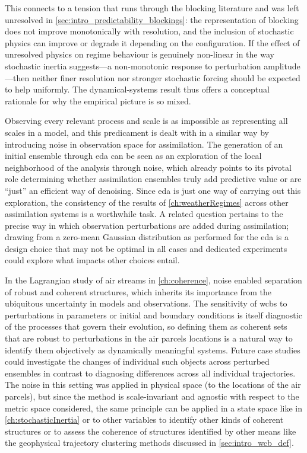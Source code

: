 This connects to a tension that runs through the blocking literature and
was left unresolved in \cref{sec:intro_predictability_blockings}: the
representation of blocking does
not improve monotonically with resolution, and the inclusion of stochastic
physics can improve or degrade it depending on the configuration. If the
effect of unresolved physics on regime behaviour is genuinely non-linear in
the way stochastic inertia suggests---a non-monotonic response to
perturbation amplitude---then neither finer resolution nor stronger
stochastic forcing should be expected to help uniformly. The
dynamical-systems result thus offers a conceptual rationale for why the
empirical picture is so mixed.

\medskip

Observing every relevant process and scale is as impossible as representing all
scales in a model, and this predicament is dealt with in a similar way by
introducing noise in observation space for assimilation. The generation of
an initial ensemble through \gls{eda} can be seen as an exploration of the
local neighborhood of the analysis through noise, which already points to
its pivotal role determining whether assimilation ensembles
truly add predictive value or are \enquote{just} an efficient way of
denoising. Since \gls{eda} is just one way of carrying out this exploration,
the consistency of the results of \cref{ch:weatherRegimes} across other
assimilation systems is a worthwhile task. A related question pertains to the
precise way in which observation perturbations are added during assimilation;
drawing from a zero-mean Gaussian distribution as performed for the
\gls{eda} is a design choice that may not be optimal in all cases and dedicated
experiments could explore what impacts other choices entail.

\medskip

In the Lagrangian study of air streams in \cref{ch:coherence}, noise
enabled separation of robust and coherent structures, which inherits its
importance
from the ubiquitous uncertainty in models and observations.
The sensitivity of \glspl{wcb} to
perturbations in parameters or initial and boundary conditions is itself
diagnostic of the processes that
govern their evolution, so defining them as coherent sets that are robust
to perturbations in the air parcels locations is a natural way to identify
them objectively as dynamically
meaningful systems. Future case studies could investigate the changes
of individual such objects across perturbed ensembles in contrast to
diagnosing differences across all individual trajectories. The noise in this
setting was applied in physical space
(to the locations of the air parcels), but since the method is scale-invariant
and agnostic with respect to the metric space considered, the same principle
can be applied
in a state space like in \cref{ch:stochasticInertia} or to other variables to
identify other kinds of coherent
structures or to assess the coherence of structures identified by other
means like the geophysical trajectory clustering methods discussed in
\cref{sec:intro_wcb_def}.

